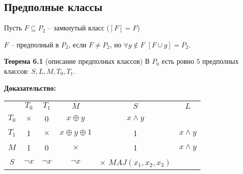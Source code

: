 \documentclass[openany]{article}
\begin{document}
   \subsection{Предполные классы}

   Пусть $F \subseteq P_2$ -- замкнутый класс ($[F] = F$)

   $F$ -- предполный в $P_2$, если $F \neq P_2$, но $\forall g \notin F$ $[F \cup {g}] = P_2$.

   \textbf{Теорема 6.1} (описание предполных классов) В $P_0$ есть ровно $5$ предполных классов: $S, L, M, T_0, T_1$.

   \textbf{Доказательство:}

   \begin{tabular}{|c|c|c|c|c|c|}
       {} & $T_0$ & $T_1$ & $M$ & $S$ & $L$ \\
       $T_0$ & $\times$ & 0 & $x \oplus y$ & $x \wedge y$ \\
       $T_1$ & 1 & $\times$ & $x \oplus y \oplus 1$ & 1 & $x \wedge y$ \\
       $M$ & 1 & 0 & $\times$ & 1 & $x \wedge y$ \\
       $S$ & $\neg x$ & $\neg x$ & $\neg x$ & $\times$ $MAJ(x_1, x_2, x_3)$ \\
   \end{tabular}
   
\end{document}

